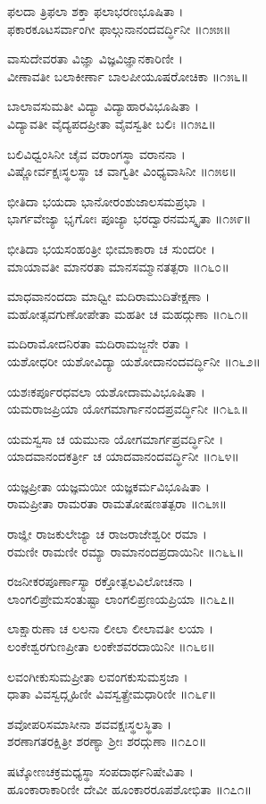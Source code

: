 ಫಲದಾ ತ್ರಿಫಲಾ ಶಕ್ತಾ ಫಲಾಭರಣಭೂಷಿತಾ ।\\
ಫಕಾರಕೂಟಸರ್ವಾಂಗೀ ಫಾಲ್ಗುನಾನಂದವರ್ದ್ಧಿನೀ ॥೧೫೫॥

ವಾಸುದೇವರತಾ ವಿಜ್ಞಾ ವಿಜ್ಞವಿಜ್ಞಾನಕಾರಿಣೀ ।\\
ವೀಣಾವತೀ ಬಲಾಕೀರ್ಣಾ ಬಾಲಪೀಯೂಷರೋಚಿಕಾ ॥೧೫೬॥

ಬಾಲಾವಸುಮತೀ ವಿದ್ಯಾ ವಿದ್ಯಾಹಾರವಿಭೂಷಿತಾ ।\\
ವಿದ್ಯಾವತೀ ವೈದ್ಯಪದಪ್ರೀತಾ ವೈವಸ್ವತೀ ಬಲಿಃ ॥೧೫೭॥

ಬಲಿವಿಧ್ವಂಸಿನೀ ಚೈವ ವರಾಂಗಸ್ಥಾ ವರಾನನಾ ।\\
ವಿಷ್ಣೋರ್ವಕ್ಷಃಸ್ಥಲಸ್ಥಾ ಚ ವಾಗ್ವತೀ ವಿಂಧ್ಯವಾಸಿನೀ ॥೧೫೮॥

ಭೀತಿದಾ ಭಯದಾ ಭಾನೋರಂಶುಜಾಲಸಮಪ್ರಭಾ ।\\
ಭಾರ್ಗವೇಜ್ಯಾ ಭೃಗೋಃ ಪೂಜ್ಯಾ ಭರದ್ವಾರನಮಸ್ಕೃತಾ ॥೧೫೯॥

ಭೀತಿದಾ ಭಯಸಂಹಂತ್ರೀ ಭೀಮಾಕಾರಾ ಚ ಸುಂದರೀ ।\\
ಮಾಯಾವತೀ ಮಾನರತಾ ಮಾನಸಮ್ಮಾನತತ್ಪರಾ ॥೧೬೦॥

ಮಾಧವಾನಂದದಾ ಮಾಧ್ವೀ ಮದಿರಾಮುದಿತೇಕ್ಷಣಾ ।\\
ಮಹೋತ್ಸವಗುಣೋಪೇತಾ ಮಹತೀ ಚ ಮಹದ್ಗುಣಾ ॥೧೬೧॥

ಮದಿರಾಮೋದನಿರತಾ ಮದಿರಾಮಜ್ಜನೇ ರತಾ ।\\
ಯಶೋಧರೀ ಯಶೋವಿದ್ಯಾ ಯಶೋದಾನಂದವರ್ದ್ಧಿನೀ ॥೧೬೨॥

ಯಶಃಕರ್ಪೂರಧವಲಾ ಯಶೋದಾಮವಿಭೂಷಿತಾ ।\\
ಯಮರಾಜಪ್ರಿಯಾ ಯೋಗಮಾರ್ಗಾನಂದಪ್ರವರ್ದ್ಧಿನೀ ॥೧೬೩॥

ಯಮಸ್ವಸಾ ಚ ಯಮುನಾ ಯೋಗಮಾರ್ಗಪ್ರವರ್ದ್ಧಿನೀ ।\\
ಯಾದವಾನಂದಕರ್ತ್ರೀ ಚ ಯಾದವಾನಂದವರ್ದ್ಧಿನೀ ॥೧೬೪॥

ಯಜ್ಞಪ್ರೀತಾ ಯಜ್ಞಮಯೀ ಯಜ್ಞಕರ್ಮವಿಭೂಷಿತಾ ।\\
ರಾಮಪ್ರೀತಾ ರಾಮರತಾ ರಾಮತೋಷಣತತ್ಪರಾ ॥೧೬೫॥

ರಾಜ್ಞೀ ರಾಜಕುಲೇಜ್ಯಾ ಚ ರಾಜರಾಜೇಶ್ವರೀ ರಮಾ ।\\
ರಮಣೀ ರಾಮಣೀ ರಮ್ಯಾ ರಾಮಾನಂದಪ್ರದಾಯಿನೀ ॥೧೬೬॥

ರಜನೀಕರಪೂರ್ಣಾಸ್ಯಾ ರಕ್ತೋತ್ಪಲವಿಲೋಚನಾ ।\\
ಲಾಂಗಲಿಪ್ರೇಮಸಂತುಷ್ಟಾ ಲಾಂಗಲಿಪ್ರಣಯಪ್ರಿಯಾ ॥೧೬೭॥

ಲಾಕ್ಷಾರುಣಾ ಚ ಲಲನಾ ಲೀಲಾ ಲೀಲಾವತೀ ಲಯಾ ।\\
ಲಂಕೇಶ್ವರಗುಣಪ್ರೀತಾ ಲಂಕೇಶವರದಾಯಿನೀ ॥೧೬೮॥

ಲವಂಗೀಕುಸುಮಪ್ರೀತಾ ಲವಂಗಕುಸುಮಸ್ರಜಾ ।\\
ಧಾತಾ ವಿವಸ್ವದ್ಗೃಹಿಣೀ ವಿವಸ್ವತ್ಪ್ರೇಮಧಾರಿಣೀ ॥೧೬೯॥

ಶವೋಪರಿಸಮಾಸೀನಾ ಶವವಕ್ಷಃಸ್ಥಲಸ್ಥಿತಾ ।\\
ಶರಣಾಗತರಕ್ಷಿತ್ರೀ ಶರಣ್ಯಾ ಶ್ರೀಃ ಶರದ್ಗುಣಾ ॥೧೭೦॥

ಷಟ್ಕೋಣಚಕ್ರಮಧ್ಯಸ್ಥಾ ಸಂಪದಾರ್ಥನಿಷೇವಿತಾ ।\\
ಹೂಂಕಾರಾಕಾರಿಣೀ ದೇವೀ ಹೂಂಕಾರರೂಪಶೋಭಿತಾ ॥೧೭೧॥

